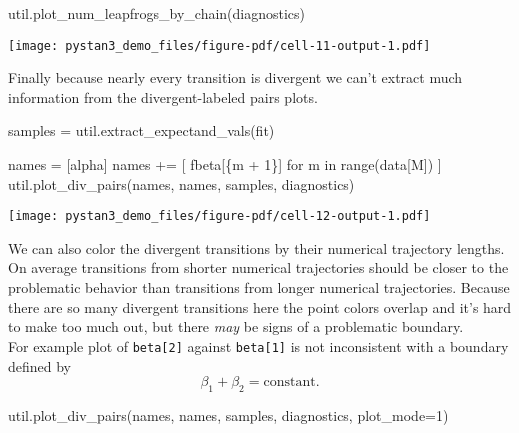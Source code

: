 \documentclass[
  letterpaper,
  DIV=11,
  numbers=noendperiod]{scrartcl}
\newenvironment{Shaded}{\begin{snugshade}}{\end{snugshade}}
\newcommand{\BuiltInTok}[1]{\textcolor[rgb]{0.00,0.23,0.31}{#1}}
\newcommand{\ControlFlowTok}[1]{\textcolor[rgb]{0.00,0.23,0.31}{#1}}
\newcommand{\DecValTok}[1]{\textcolor[rgb]{0.68,0.00,0.00}{#1}}
\newcommand{\KeywordTok}[1]{\textcolor[rgb]{0.00,0.23,0.31}{#1}}
\newcommand{\NormalTok}[1]{\textcolor[rgb]{0.00,0.23,0.31}{#1}}
\newcommand{\OperatorTok}[1]{\textcolor[rgb]{0.37,0.37,0.37}{#1}}
\newcommand{\SpecialCharTok}[1]{\textcolor[rgb]{0.37,0.37,0.37}{#1}}
\newcommand{\SpecialStringTok}[1]{\textcolor[rgb]{0.13,0.47,0.30}{#1}}
\newcommand{\StringTok}[1]{\textcolor[rgb]{0.13,0.47,0.30}{#1}}
\begin{document}
\begin{Shaded}
\begin{Highlighting}[]
\NormalTok{util.plot\_num\_leapfrogs\_by\_chain(diagnostics)}
\end{Highlighting}
\end{Shaded}

\texttt{[image: pystan3\_demo\_files/figure-pdf/cell-11-output-1.pdf]}

Finally because nearly every transition is divergent we can't extract
much information from the divergent-labeled pairs plots.

\begin{Shaded}
\begin{Highlighting}[]
\NormalTok{samples }\OperatorTok{=}\NormalTok{ util.extract\_expectand\_vals(fit)}

\NormalTok{names }\OperatorTok{=}\NormalTok{ [}\StringTok{\textquotesingle{}alpha\textquotesingle{}}\NormalTok{]}
\NormalTok{names }\OperatorTok{+=}\NormalTok{ [ }\SpecialStringTok{f\textquotesingle{}beta[}\SpecialCharTok{\{}\NormalTok{m }\OperatorTok{+} \DecValTok{1}\SpecialCharTok{\}}\SpecialStringTok{]\textquotesingle{}} \ControlFlowTok{for}\NormalTok{ m }\KeywordTok{in} \BuiltInTok{range}\NormalTok{(data[}\StringTok{\textquotesingle{}M\textquotesingle{}}\NormalTok{]) ]}
\NormalTok{util.plot\_div\_pairs(names, names, samples, diagnostics)}
\end{Highlighting}
\end{Shaded}

\texttt{[image: pystan3\_demo\_files/figure-pdf/cell-12-output-1.pdf]}

We can also color the divergent transitions by their numerical
trajectory lengths. On average transitions from shorter numerical
trajectories should be closer to the problematic behavior than
transitions from longer numerical trajectories. Because there are so
many divergent transitions here the point colors overlap and it's hard
to make too much out, but there \emph{may} be signs of a problematic
boundary.\\
For example plot of \texttt{beta{[}2{]}} against \texttt{beta{[}1{]}} is
not inconsistent with a boundary defined by \[
\beta_{1} + \beta_{2} = \mathrm{constant}.
\]

\begin{Shaded}
\begin{Highlighting}[]
\NormalTok{util.plot\_div\_pairs(names, names, samples, diagnostics, plot\_mode}\OperatorTok{=}\DecValTok{1}\NormalTok{)}
\end{Highlighting}
\end{Shaded}
\end{document}
